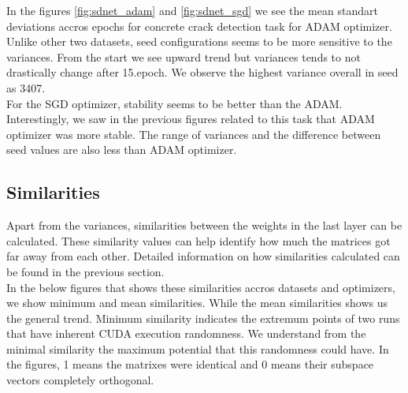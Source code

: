 In the figures \ref{fig:sdnet_adam} and \ref{fig:sdnet_sgd}  we see the mean standart deviations accros epochs for concrete crack detection task for ADAM optimizer.
Unlike other two datasets, seed configurations seems to be more sensitive to the variances. From the start we see upward trend but variances tends to not drastically change after 15.epoch.
We observe the highest variance overall in seed as 3407.\\

For the SGD optimizer, stability seems to be better than the ADAM. Interestingly, we saw in the previous figures related to this task that ADAM optimizer was more stable.
The range of variances and the difference between seed values are also less than ADAM optimizer.



\subsection{Similarities}

Apart from the variances, similarities between the weights in the last layer can be calculated. These similarity values can help
identify how much the matrices got far away from each other. Detailed information on how similarities calculated can be found in the previous section.\\

In the below figures that shows these similarities accros datasets and optimizers, we show minimum and mean similarities. While the mean similarities shows us the general trend. 
Minimum similarity indicates the extremum points of two runs that have inherent CUDA execution randomness. We understand from the minimal similarity the maximum potential that this randomness could have.
In the figures, 1 means the matrixes were identical and 0 means their subspace vectors completely orthogonal.
\clearpage

